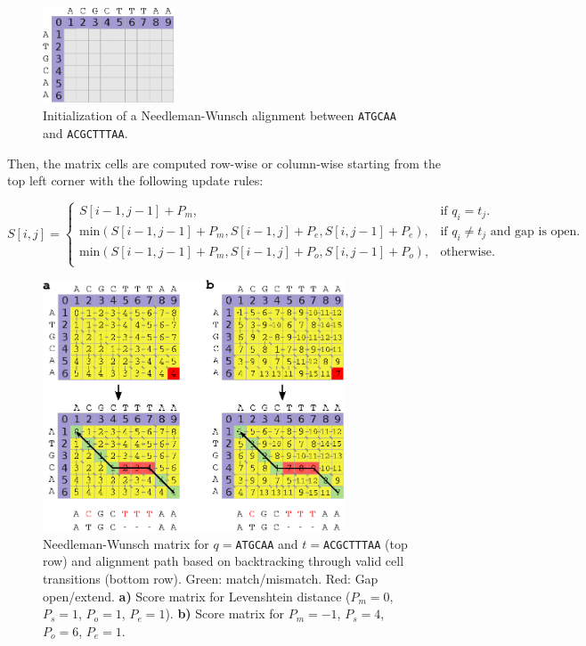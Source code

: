 \begin{figure}[h]
	\begin{minipage}[b]{\linewidth}
	  \centering
	  \includegraphics*[width=0.35\textwidth]{figures/chap1_nw_init}
	  \caption{Initialization of a Needleman-Wunsch alignment between
       \texttt{ATGCAA} and \texttt{ACGCTTTAA}.}
	  \label{fig:chap1:nw-init}
   \end{minipage}
\end{figure}


Then, the matrix cells are computed row-wise or column-wise starting
from the top left corner with the following update rules:

\begin{equation}
  \label{eq:chap1:nw-update}
  S[i,j] = \begin{cases}
    S[i-1,j-1] + P_m, & \text{if $q_i = t_j$}.\\
    \mbox{min}(S[i-1,j-1] + P_m,S[i-1,j] + P_e,S[i,j-1]+P_e), & \text{if
    $q_i \neq t_j$ and gap is open}. \\
    \mbox{min}(S[i-1,j-1] + P_m,S[i-1,j] + P_o,S[i,j-1]+P_o),
    & \text{otherwise}. \\
 \end{cases}
\end{equation}

\begin{figure}[!h]
	\begin{minipage}[b]{\linewidth}
	  \centering
	  \includegraphics*[width=0.8\textwidth]{figures/chap1_nw_alignments}
	  \caption{Needleman-Wunsch matrix for $q=$\texttt{ATGCAA} and
       $t=$\texttt{ACGCTTTAA} (top row) and alignment path based on
       backtracking through valid cell transitions (bottom
       row). Green: match/mismatch. Red: Gap open/extend. \textbf{a)}
       Score matrix for Levenshtein distance 
       ($P_m=0$, $P_s=1$, $P_o=1$, $P_e=1$). \textbf{b)} Score matrix
       for $P_m=-1$, $P_s=4$, $P_o=6$, $P_e=1$. }
	  \label{fig:chap1:nw-alignments}
   \end{minipage}
\end{figure}

